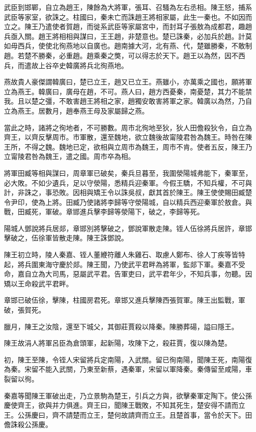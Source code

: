 武臣到邯鄲，自立為趙王，陳餘為大將軍，張耳、召騷為左右丞相。陳王怒，捕系武臣等家室，欲誅之。柱國曰，秦未亡而誅趙王將相家屬，此生一秦也。不如因而立之。陳王乃遣使者賀趙，而徙系武臣等家屬宮中，而封耳子張敖為成都君，趣趙兵亟入關。趙王將相相與謀曰，王王趙，非楚意也。楚已誅秦，必加兵於趙。計莫如毋西兵，使使北徇燕地以自廣也。趙南據大河，北有燕、代，楚雖勝秦，不敢制趙。若楚不勝秦，必重趙。趙乘秦之獘，可以得志於天下。趙王以為然，因不西兵，而遣故上谷卒史韓廣將兵北徇燕地。

燕故貴人豪傑謂韓廣曰，楚已立王，趙又已立王。燕雖小，亦萬乘之國也，願將軍立為燕王。韓廣曰，廣母在趙，不可。燕人曰，趙方西憂秦，南憂楚，其力不能禁我。且以楚之彊，不敢害趙王將相之家，趙獨安敢害將軍之家。韓廣以為然，乃自立為燕王。居數月，趙奉燕王母及家屬歸之燕。

當此之時，諸將之徇地者，不可勝數。周市北徇地至狄，狄人田儋殺狄令，自立為齊王，以齊反擊周市。市軍散，還至魏地，欲立魏後故甯陵君咎為魏王。時咎在陳王所，不得之魏。魏地已定，欲相與立周市為魏王，周市不肯。使者五反，陳王乃立甯陵君咎為魏王，遣之國。周市卒為相。

將軍田臧等相與謀曰，周章軍已破矣，秦兵旦暮至，我圍滎陽城弗能下，秦軍至，必大敗。不如少遺兵，足以守滎陽，悉精兵迎秦軍。今假王驕，不知兵權，不可與計，非誅之，事恐敗。因相與矯王令以誅吳叔，獻其首於陳王。陳王使使賜田臧楚令尹印，使為上將。田臧乃使諸將李歸等守滎陽城，自以精兵西迎秦軍於敖倉。與戰，田臧死，軍破。章邯進兵擊李歸等滎陽下，破之，李歸等死。

陽城人鄧說將兵居郯，章邯別將擊破之，鄧說軍散走陳。铚人伍徐將兵居許，章邯擊破之，伍徐軍皆散走陳。陳王誅鄧說。

陳王初立時，陵人秦嘉、铚人董緶符離人朱雞石、取慮人鄭布、徐人丁疾等皆特起，將兵圍東海守慶於郯。陳王聞，乃使武平君畔為將軍，監郯下軍。秦嘉不受命，嘉自立為大司馬，惡屬武平君。告軍吏曰，武平君年少，不知兵事，勿聽。因矯以王命殺武平君畔。

章邯已破伍徐，擊陳，柱國房君死。章邯又進兵擊陳西張賀軍。陳王出監戰，軍破，張賀死。

臘月，陳王之汝陰，還至下城父，其御莊賈殺以降秦。陳勝葬碭，謚曰隱王。

陳王故涓人將軍呂臣為倉頭軍，起新陽，攻陳下之，殺莊賈，復以陳為楚。

初，陳王至陳，令铚人宋留將兵定南陽，入武關。留已徇南陽，聞陳王死，南陽復為秦。宋留不能入武關，乃東至新蔡，遇秦軍，宋留以軍降秦。秦傳留至咸陽，車裂留以徇。

秦嘉等聞陳王軍破出走，乃立景駒為楚王，引兵之方與，欲擊秦軍定陶下。使公孫慶使齊王，欲與并力俱進。齊王曰，聞陳王戰敗，不知其死生，楚安得不請而立王。公孫慶曰，齊不請楚而立王，楚何故請齊而立王。且楚首事，當令於天下。田儋誅殺公孫慶。

